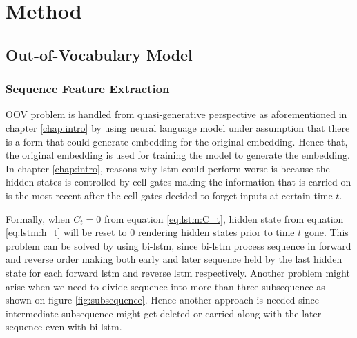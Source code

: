 \chapter{Method}
\label{chap:method}

\section{Out-of-Vocabulary Model}
    \subsection{Sequence Feature Extraction}
        OOV problem is handled from quasi-generative perspective as
        aforementioned in chapter \ref{chap:intro} by using neural
        language model under assumption that there is a form that
        could generate embedding for the original embedding. Hence
        that, the original embedding is used for training the model to
        generate the embedding. In chapter \ref{chap:intro}, reasons
        why lstm could perform worse is because the hidden states is
        controlled by cell gates making the information that is
        carried on is the most recent after the cell gates decided to
        forget inputs at certain time $t$. 


        Formally, when $C_t = 0$ from equation \ref{eq:lstm:C_t},
        hidden state from equation \ref{eq:lstm:h_t} will be reset to
        $0$ rendering hidden states prior to time $t$ gone. This
        problem can be solved by using bi-lstm, since bi-lstm process
        sequence in forward and reverse order making both early and
        later sequence held by the last hidden state for each forward
        lstm and reverse lstm respectively. Another problem might
        arise when we need to divide sequence into more than three
        subsequence as shown on figure \ref{fig:subsequence}. Hence
        another approach is needed since intermediate subsequence
        might get deleted or carried along with the later sequence
        even with bi-lstm.

